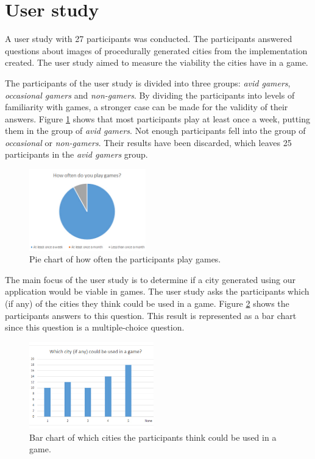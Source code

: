 \section{User study}
	A user study with 27 participants was conducted. The participants answered questions about images of procedurally generated cities from the implementation created. The user study aimed to measure the viability the cities have in a game.
	
	\par
	The participants of the user study is divided into three groups: \textit{avid gamers}, \textit{occasional gamers} and \textit{non-gamers}. By dividing the participants into levels of familiarity with games, a stronger case can be made for the validity of their answers. Figure \ref{fig:pie-chart-often-play} shows that most participants play at least once a week, putting them in the group of \textit{avid gamers}. Not enough participants fell into the group of \textit{occasional} or \textit{non-gamers}. Their results have been discarded, which leaves 25 participants in the \textit{avid gamers} group.
	
	\begin{figure}[h]
		\centering
		\includegraphics[width=0.45\textwidth]{"Images/OftenPlay"}
		\caption{Pie chart of how often the participants play games.}
		\label{fig:pie-chart-often-play}
	\end{figure}
	
	The main focus of the user study is to determine if a city generated using our application would be viable in games. The user study asks the participants which (if any) of the cities they think could be used in a game. Figure \ref{fig:pie-chart-use-in-game} shows the participants answers to this question. This result is represented as a bar chart since this question is a multiple-choice question.
	
	\begin{figure}[h]
		\centering
		\includegraphics[width=0.48\textwidth]{"Images/UseInGame"}
		\caption{Bar chart of which cities the participants think could be used in a game.}
		\label{fig:pie-chart-use-in-game}
	\end{figure}
	
